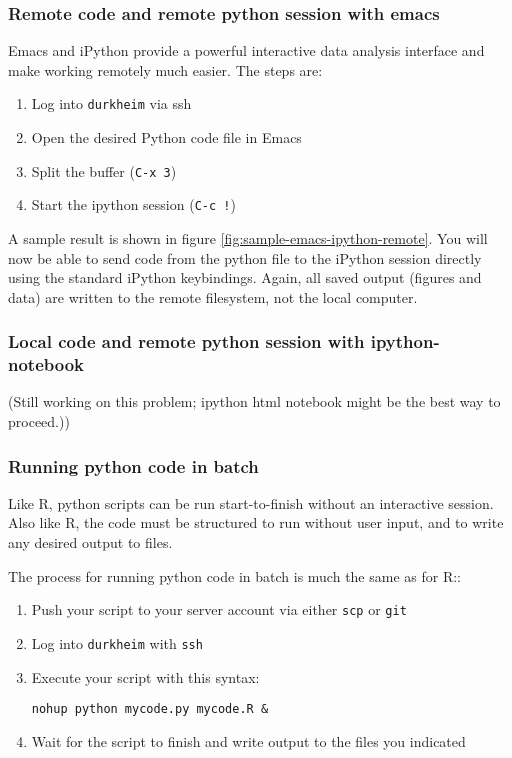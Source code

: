 \documentclass[11pt]{article}
\begin{document}
\subsubsection{Remote code and remote python session with emacs}
\label{sec:remote-code-remote}

Emacs and iPython provide a powerful interactive data analysis
interface and make working remotely much easier. The steps are:
\begin{enumerate}
\item Log into \texttt{durkheim} via ssh
\item Open the desired Python code file in Emacs
\item Split the buffer (\texttt{C-x 3})
\item Start the ipython session (\texttt{C-c !})
\end{enumerate}
A sample result is shown in figure
\ref{fig:sample-emacs-ipython-remote}. You will now be able to send code from the python file to the iPython
session directly using the standard iPython keybindings. Again, all
saved output (figures and data) are written to the remote filesystem,
not the local computer. 

\subsubsection{Local code and remote python session with ipython-notebook}
\label{sec:local-code-remote}

(Still working on this problem; ipython html notebook might be the
best way to proceed.))


\subsubsection{Running python code in batch}
\label{sec:running-python-code}

Like R, python scripts can be run start-to-finish without an
interactive session. Also like R, the code must be structured to run
without user input, and to write any desired output to files. 

The process for running python code in batch is much the same as for R::
\begin{enumerate}
\item Push your script to your server account via either \texttt{scp}
  or \texttt{git}
\item Log into \texttt{durkheim} with \texttt{ssh}
\item Execute your script with this syntax: 
\begin{verbatim}
nohup python mycode.py mycode.R &
\end{verbatim}
\item Wait for the script to finish and write output to the files you indicated
\end{enumerate}
\end{document}
